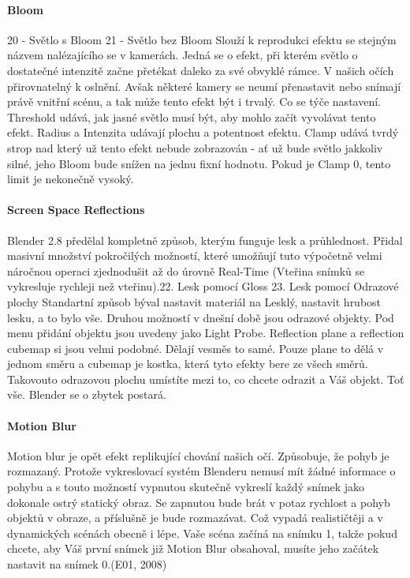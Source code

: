 \documentclass[12pt,a4paper]{report}
\begin{document}
	\paragraph{Bloom} 20 - Světlo s Bloom
	21 - Světlo bez Bloom
	Slouží k reprodukci efektu se stejným názvem nalézajícího se v kamerách.
	Jedná se o efekt, při kterém světlo o dostatečné intenzitě začne přetékat
	daleko za své obvyklé rámce. V našich očích přirovnatelný k oslnění.
	Avšak některé kamery se neumí přenastavit nebo snímají právě vnitřní
	scénu, a tak může tento efekt být i trvalý.
	Co se týče nastavení. Threshold udává, jak jasné světlo musí být, aby
	mohlo začít vyvolávat tento efekt. Radius a Intenzita udávají plochu
	a potentnost efektu. Clamp udává tvrdý strop nad který už tento efekt
	nebude zobrazován - ať už bude světlo jakkoliv silné, jeho Bloom bude
	snížen na jednu fixní hodnotu. Pokud je Clamp 0, tento limit je nekonečně
	vysoký.
	
	\paragraph{Screen Space Reflections} 
	Blender 2.8 předělal kompletně způsob, kterým funguje lesk a
	průhlednost. Přidal masivní množství pokročilých možností, které
	umožňují tuto výpočetně velmi náročnou operaci zjednodušit až do úrovně
	Real-Time (Vteřina snímků se vykresluje rychleji než vteřinu).22. Lesk pomocí Gloss
	23. Lesk pomocí Odrazové plochy
	Standartní způsob býval nastavit materiál na Lesklý, nastavit hrubost
	lesku, a to bylo vše. Druhou možností v dnešní době jsou odrazové
	objekty. Pod menu přidání objektu jsou uvedeny jako Light Probe.
	Reflection plane a reflection cubemap si jsou velmi podobné. Dělají
	vesměs to samé. Pouze plane to dělá v jednom směru a cubemap je
	kostka, která tyto efekty bere ze všech směrů. Takovouto odrazovou
	plochu umístíte mezi to, co chcete odrazit a Váš objekt. Toť vše. Blender
	se o zbytek postará.
	
	\paragraph{Motion Blur} Motion blur je opět efekt replikující chování našich očí. Způsobuje, že
	pohyb je rozmazaný. Protože vykreslovací systém Blenderu nemusí mít
	žádné informace o pohybu a s touto možností vypnutou skutečně vykreslí
	každý snímek jako dokonale ostrý statický obraz. Se zapnutou bude brát
	v potaz rychlost a pohyb objektů v obraze, a příslušně je bude
	rozmazávat. Což vypadá realističtěji a v dynamických scénách obecně i
	lépe. Vaše scéna začíná na snímku 1, takže pokud chcete, aby Váš první
	snímek již Motion Blur obsahoval, musíte jeho začátek nastavit
	na snímek 0.(E01, 2008)
	
\end{document}
